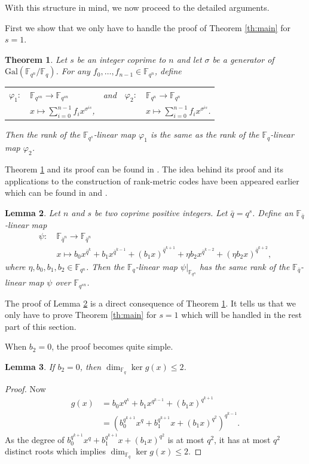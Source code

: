 \documentclass{amsart}
\theoremstyle{plain}
\newtheorem{theorem}{Theorem}[section]
\newtheorem{lemma}[theorem]{Lemma}
\theoremstyle{definition}
\newcommand{\F}{\mathbb F}
\begin{document}
		With this structure in mind, we now proceed to the detailed arguments.

	First we show that we only have to handle the proof of Theorem \ref{th:main} for $s=1$.
	\begin{theorem}\label{th:s->1}
		Let $s$ be an integer coprime to $n$ and let $\sigma$ be a generator of $\mathrm{Gal}(\mathbb{F}_{q^n}/\mathbb{F}_q)$. 
		For any $f_0,\dots,f_{n-1}\in \F_{q^n}$, define
		\begin{table}[h]
			\begin{tabular}{lllll}
				$\varphi_1:$ & $\F_{q^{sn}} \rightarrow \F_{q^{sn}}$ &   and & $\varphi_2:$ & $\F_{q^{n}} \rightarrow \F_{q^{n}}$ \\
				& $x\mapsto \sum_{i=0}^{n-1} f_i x^{\sigma^{is}}$,&    &  & $x\mapsto \sum_{i=0}^{n-1} f_i x^{\sigma^{is}}$.
			\end{tabular}
		\end{table}
		
		\noindent Then the rank of the $\F_{q^s}$-linear map $\varphi_1$ is the same as the rank of the $\F_q$-linear map $\varphi_2$.
	\end{theorem}
	Theorem \ref{th:s->1} and its proof can be found in \cite[Theorem 3.2]{neri_extending_2022}. The idea behind its proof and its applications to the construction of rank-metric codes have been appeared earlier which can be found in \cite{gow_galois_2009} and \cite{sheekey_new_2016}.
	
	\begin{lemma}\label{lem:s->1_our}
		Let $n$ and $s$ be two coprime positive integers. Let $\bar{q}=q^s$. Define an $\F_{\bar{q}}$-linear map
		\begin{align*}
			\psi:~ &\F_{\bar{q}^n} \rightarrow \F_{\bar{q}^n} \\
			&x \mapsto b_0x^{\bar{q}^{k}}+b_1x^{\bar{q}^{k-1}}+(b_1x)^{\bar{q}^{k+1}}+\eta b_2x^{\bar{q}^{k-2}}+(\eta b_2x)^{\bar{q}^{k+2}},
		\end{align*}
		where $\eta,b_0,b_1,b_2\in \F_{q^n}$. Then the $\F_q$-linear map $\psi|_{\F_{q^n}}$ has the same rank of the $\F_{\bar{q}}$-linear map $\psi$ over $\F_{q^{sn}}$. 
	\end{lemma}
	The proof of Lemma \ref{lem:s->1_our} is a direct consequence of Theorem \ref{th:s->1}. It tells us that we only have to prove Theorem \ref{th:main} for $s=1$ which will be handled in the rest part of this section.
	
	When $b_2=0$, the proof becomes quite simple.
	\begin{lemma}\label{lem:2_2}
		If $b_2=0$, then $\dim_{\F_q}\ker g(x)\leq2$.
	\end{lemma}
	\begin{proof}
		Now 
		\begin{align*}
			g(x) &=b_0x^{q^{k}}+b_1x^{q^{k-1}}+(b_1x)^{q^{k+1}}\\
			&= \left(  b_0^{q^{k+1}}x^q+b_1^{q^{k+1}}x +(b_1x)^{q^{2}}     \right)^{q^{k-1}}. 
		\end{align*}
		As the degree of $b_0^{q^{k+1}}x^q+b_1^{q^{k+1}}x +(b_1x)^{q^{2}}$ is at most $q^2$, it has at most $q^2$ distinct roots which implies $\dim_{\F_q}\ker g(x)\leq2$.
	\end{proof}
	
\end{document}
